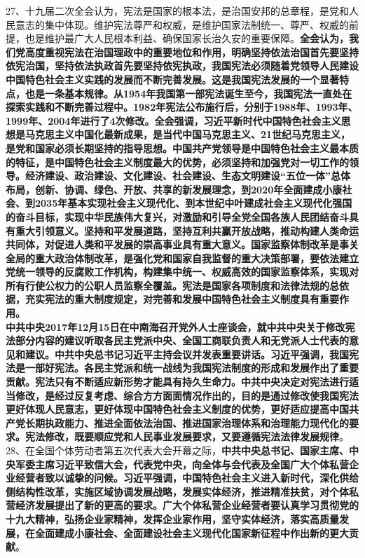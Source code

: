 27、十九届二次全会认为，宪法是国家的根本法，是治国安邦的总章程，是党和人民意志的集中体现。维护宪法尊严和权威，是维护国家法制统一、尊严、权威的前提，也是维护最广大人民根本利益、确保国家长治久安的重要保障。{\textbf{全会认为，我们党高度重视宪法在治国理政中的重要地位和作用，明确坚持依法治国首先要坚持依宪治国，坚持依法执政首先要坚持依宪执政，我国宪法必须随着党领导人民建设中国特色社会主义实践的发展而不断完善发展。这是我国宪法发展的一个显著特点，也是一条基本规律。从1954年我国第一部宪法诞生至今，我国宪法一直处在探索实践和不断完善过程中。1982年宪法公布施行后，分别于1988年、1993年、1999年、2004年进行了4次修改。全会强调，习近平新时代中国特色社会主义思想是马克思主义中国化最新成果，是当代中国马克思主义、21世纪马克思主义，是党和国家必须长期坚持的指导思想。中国共产党领导是中国特色社会主义最本质的特征，是中国特色社会主义制度最大的优势，必须坚持和加强党对一切工作的领导。经济建设、政治建设、文化建设、社会建设、生态文明建设``五位一体''总体布局，创新、协调、绿色、开放、共享的新发展理念，到2020年全面建成小康社会、到2035年基本实现社会主义现代化、到本世纪中叶建成社会主义现代化强国的奋斗目标，实现中华民族伟大复兴，对激励和引导全党全国各族人民团结奋斗具有重大引领意义。坚持和平发展道路，坚持互利共赢开放战略，推动构建人类命运共同体，对促进人类和平发展的崇高事业具有重大意义。国家监察体制改革是事关全局的重大政治体制改革，是强化党和国家自我监督的重大决策部署，要依法建立党统一领导的反腐败工作机构，构建集中统一、权威高效的国家监察体系，实现对所有行使公权力的公职人员监察全覆盖。宪法是国家各项制度和法律法规的总依据，充实宪法的重大制度规定，对完善和发展中国特色社会主义制度具有重要作用。\\
中共中央2017年12月15日在中南海召开党外人士座谈会，就中共中央关于修改宪法部分内容的建议听取各民主党派中央、全国工商联负责人和无党派人士代表的意见和建议。中共中央总书记习近平主持会议并发表重要讲话。习近平强调，我国宪法是一部好宪法。各民主党派和统一战线为我国宪法制度的形成和发展作出了重要贡献。宪法只有不断适应新形势才能具有持久生命力。中共中央决定对宪法进行适当修改，是经过反复考虑、综合方方面面情况作出的，目的是通过修改使我国宪法更好体现人民意志，更好体现中国特色社会主义制度的优势，更好适应提高中国共产党长期执政能力、推进全面依法治国、推进国家治理体系和治理能力现代化的要求。宪法修改，既要顺应党和人民事业发展要求，又要遵循宪法法律发展规律}}。\\
28、在全国个体劳动者第五次代表大会开幕之际，{\textbf{中共中央总书记、国家主席、中央军委主席习近平致信大会，代表党中央，向全体与会代表及全国广大个体私营企业经营者致以诚挚的问候。习近平强调，中国特色社会主义进入新时代，深化供给侧结构性改革，实施区域协调发展战略，发展实体经济，推进精准扶贫，对个体私营经济发展提出了新的更高的要求。广大个体私营企业经营者要认真学习贯彻党的十九大精神，弘扬企业家精神，发挥企业家作用，坚守实体经济，落实高质量发展，在全面建成小康社会、全面建设社会主义现代化国家新征程中作出新的更大贡献}}。

